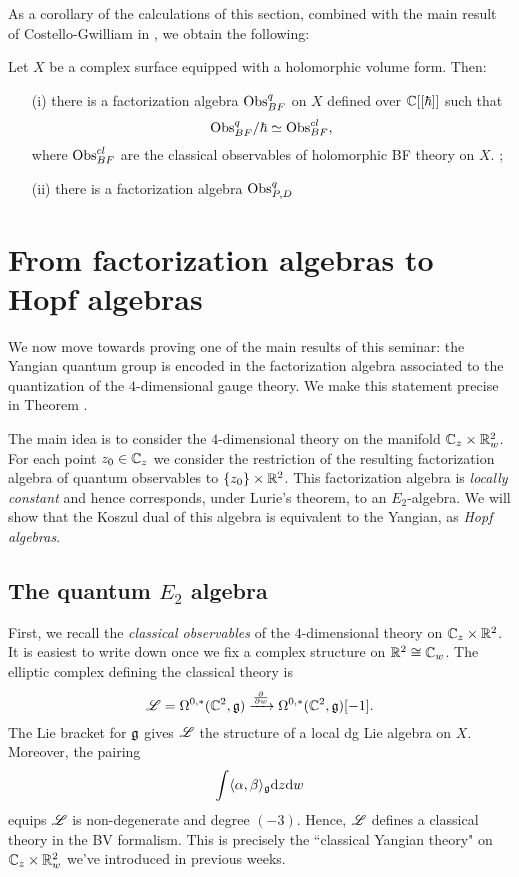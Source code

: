 \documentclass[11pt]{amsart}
\begin{document}
As a corollary of the calculations of this section, combined with the main result of Costello-Gwilliam in \cite{CG2}, we obtain the following:

\begin{thm}\label{thm: qfact}
Let $X$ be a complex surface equipped with a holomorphic volume form.
Then:
\begin{enumerate}
\item[(i)]
there is a factorization algebra ${\rm Obs}^{q}_{BF}$ on $X$ defined over $\mathbb C[[\hbar]]$ such that
\[
{\rm Obs}^q_{BF} / \hbar \simeq {\rm Obs}^{cl}_{BF},
\] 
where ${\rm Obs}^{cl}_{BF}$ are the classical observables of holomorphic BF theory on $X$. ;
\item[(ii)] 
there is a factorization algebra ${\rm Obs}_{P,D}^q$
\end{enumerate}
\end{thm}

\section{From factorization algebras to Hopf algebras}

We now move towards proving one of the main results of this seminar: the Yangian quantum group is encoded in the factorization algebra associated to the quantization of the $4$-dimensional gauge theory. 
We make this statement precise in Theorem \cite{}. 

The main idea is to consider the $4$-dimensional theory on the manifold $\mathbb C_z \times \mathbb R^2_w$. 
For each point $z_0 \in \mathbb C_z$ we consider the restriction of the resulting factorization algebra of quantum observables to $\{z_0\} \times \mathbb R^2$. 
This factorization algebra is {\em locally constant} and hence corresponds, under Lurie's theorem, to an $E_2$-algebra. 
We will show that the Koszul dual of this algebra is equivalent to the Yangian, as {\em Hopf algebras}. 

\subsection{The quantum $E_2$ algebra}

First, we recall the {\em classical observables} of the $4$-dimensional theory on $\mathbb C_z \times \mathbb R^2$. 
It is easiest to write down once we fix a complex structure on $\mathbb R^2 \cong \mathbb C_w$. 
The elliptic complex defining the classical theory is
\[
\mathscr L = \Omega^{0,*}(\mathbb C^2 , \mathfrak g) \xrightarrow{\frac{\partial}{\partial w}} \Omega^{0,*}(\mathbb C^2, \mathfrak g)[-1] .
\] 
The Lie bracket for $\mathfrak g$ gives $\mathscr L$ the structure of a local dg Lie algebra on $X$. 
Moreover, the pairing
\[
\int \langle\alpha, \beta\rangle_\mathfrak g {\rm d} z {\rm d} w
\]
equips $\mathscr L$ is non-degenerate and degree $(-3)$. 
Hence, $\mathscr L$ defines a classical theory in the BV formalism. 
This is precisely the ``classical Yangian theory" on $\mathbb C_z \times \mathbb R^2_w$ we've introduced in previous weeks. 
\end{document}

